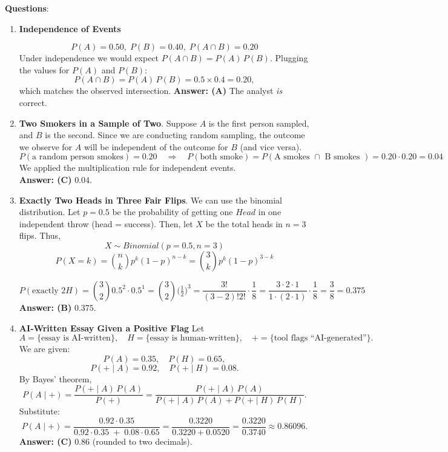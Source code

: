 \documentclass{article}
\begin{document}
\textbf{Questions}:
\begin{enumerate}
  \item \textbf{Independence of Events}  
  
        \[
          P(A)=0.50,\;P(B)=0.40,\;P(A\cap B)=0.20
        \]
        Under independence we would expect $P(A\cap B)=P(A)\,P(B)$. Plugging the values for $P(A)$ and $P(B)$:
        \[
          P(A\cap B)=P(A)\,P(B)=0.5\times0.4=0.20,
        \]
        which matches the observed intersection.  
        \textbf{Answer: (A)} The analyst \emph{is} correct.

  \item \textbf{Two Smokers in a Sample of Two}.  Suppose $A$ is the first person sampled, and $B$ is the second. Since we are conducting random sampling, the outcome we observe for $A$ will be independent of the outcome for $B$ (and vice versa).
        \[
          P(\text{a random person smokes}) = 0.20 \quad\Longrightarrow\quad
          P(\text{both smoke}) = P(\text{A smokes } \cap \text{ B smokes } ) = 0.20\cdot 0.20 = 0.04
        \]
        We applied the multiplication rule for independent events. \\
        \textbf{Answer: (C)} \(0.04\).

  \item \textbf{Exactly Two Heads in Three Fair Flips}. We can use the binomial distribution. Let $p=0.5$ be the probability of getting one $Head$ in one independent throw (head = success). Then, let $X$ be the total heads in $n=3$ flips. Thus,
  $$ X \sim Binomial(p=0.5, n=3)$$
  $$P(X=k)=\binom{n}{k}p^k (1-p)^{n-k}=\binom{3}{k}p^k (1-p)^{3-k}$$

        \[
          P(\text{exactly }2H)=\binom{3}{2}0.5^2 \cdot 0.5^1 =\binom{3}{2}\bigl(\tfrac12\bigr)^3
          =  \frac{3!}{(3-2)! 2!} \cdot \frac{1}{8}
          = \frac{3\cdot 2 \cdot 1}{1 \cdot (2 \cdot 1)} \cdot \frac{1}{8}
          =\frac{3}{8}=0.375
        \]
        \textbf{Answer: (B)} \(0.375\).

\item \textbf{AI‐Written Essay Given a Positive Flag}  
Let
\[
A = \{\text{essay is AI‐written}\},\quad
H = \{\text{essay is human‐written}\},\quad
+ = \{\text{tool flags ``AI‐generated''}\}.
\]
We are given:
\[
P(A)=0.35,\quad P(H)=0.65,
\]
\[
P(+\mid A)=0.92,\quad P(+\mid H)=0.08.
\]
By Bayes’ theorem,
\[
P(A\mid+)
=\frac{P(+\mid A)\,P(A)}{P(+)}
=\frac{P(+\mid A)\,P(A)}{P(+\mid A)\,P(A)+P(+\mid H)\,P(H)}.
\]
Substitute:
\[
P(A\mid+)
=\frac{0.92\cdot0.35}{0.92\cdot0.35 \;+\; 0.08\cdot0.65}
=\frac{0.3220}{0.3220+0.0520}
=\frac{0.3220}{0.3740}
\approx0.86096.
\]
\textbf{Answer: (C)} \(0.86\) (rounded to two decimals).

\end{enumerate}
\end{document}
